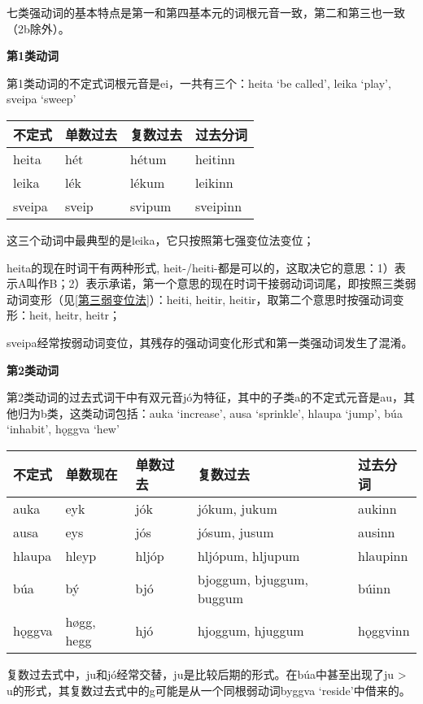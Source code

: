 七类强动词的基本特点是第一和第四基本元的词根元音一致，第二和第三也一致（2b除外）。

\textbf{第1类动词}

第1类动词的不定式词根元音是ei，一共有三个：heita `be called', leika
`play', sveipa `sweep'

\begin{longtable}{llll}
  \toprule
  不定式    & 单数过去  & 复数过去   & 过去分词     \\
  \midrule
  \endhead
  \bottomrule
  \endfoot
  heita  & hét   & hétum  & heitinn  \\
  leika  & lék   & lékum  & leikinn  \\
  sveipa & sveip & svipum & sveipinn \\
\end{longtable}

这三个动词中最典型的是leika，它只按照第七强变位法变位；

heita的现在时词干有两种形式,
heit-/heiti-都是可以的，这取决它的意思：1）表示A叫作B；2）表示承诺，第一个意思的现在时词干接弱动词词尾，即按照三类弱动词变形（见\ref{第三弱变位法}）：heiti,
heitir, heitir，取第二个意思时按强动词变形：heit, heitr, heitr；

sveipa经常按弱动词变位，其残存的强动词变化形式和第一类强动词发生了混淆。

\textbf{第2类动词}

第2类动词的过去式词干中有双元音jó为特征，其中的子类a的不定式元音是au，其他归为b类，这类动词包括：auka
`increase', ausa `sprinkle', hlaupa `jump', búa `inhabit', hǫggva `hew‌'

\begin{longtable}{lllll}
  \toprule
  不定式    & 单数现在       & 单数过去  & 复数过去                     & 过去分词     \\
  \midrule
  \endhead
  \bottomrule
  \endfoot
  auka   & eyk        & jók   & jókum, jukum             & aukinn   \\
  ausa   & eys        & jós   & jósum, jusum             & ausinn   \\
  hlaupa & hleyp      & hljóp & hljópum, hljupum         & hlaupinn \\
  búa    & bý         & bjó   & bjoggum, bjuggum, buggum & búinn    \\
  hǫggva & høgg, hegg & hjó   & hjoggum, hjuggum         & hǫggvinn \\
\end{longtable}

复数过去式中，ju和jó经常交替，ju是比较后期的形式。在búa中甚至出现了ju
\textgreater{} u的形式，其复数过去式中的g可能是从一个同根弱动词byggva
`reside'中借来的。

